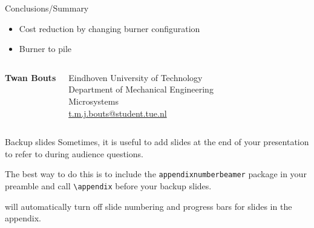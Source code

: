 \documentclass[11pt,aspectratio=43,mathserif]{beamer}
\begin{document}
\begin{frame}{Conclusions/Summary}
	\begin{itemize}
		\item Cost reduction by changing burner configuration
		\item Burner to pile
	\end{itemize}
\end{frame}

{
\begin{frame}{}  
	\begin{center}
	\end{center}
\end{frame}
}

\begin{frame}
	\vspace*{3em}
	\begin{columns}[onlytextwidth,c]
    	\textbf{Twan Bouts}
    	
    	{\scriptsize
    	Eindhoven University of Technology\\
    	Department of Mechanical Engineering\\
    	Microsystems\\
		\vspace*{1em}
    	\href{mailto:t.m.j.bouts@student.tue.nl}{t.m.j.bouts@student.tue.nl}\\
    	}
    \end{columns}
    \vspace*{1em}
\end{frame}

\appendix
\begin{frame}[fragile]{Backup slides}
  Sometimes, it is useful to add slides at the end of your presentation to
  refer to during audience questions.

  The best way to do this is to include the \verb|appendixnumberbeamer|
  package in your preamble and call \verb|\appendix| before your backup slides.

  will automatically turn off slide numbering and progress bars for
  slides in the appendix.
\end{frame}
\end{document}
